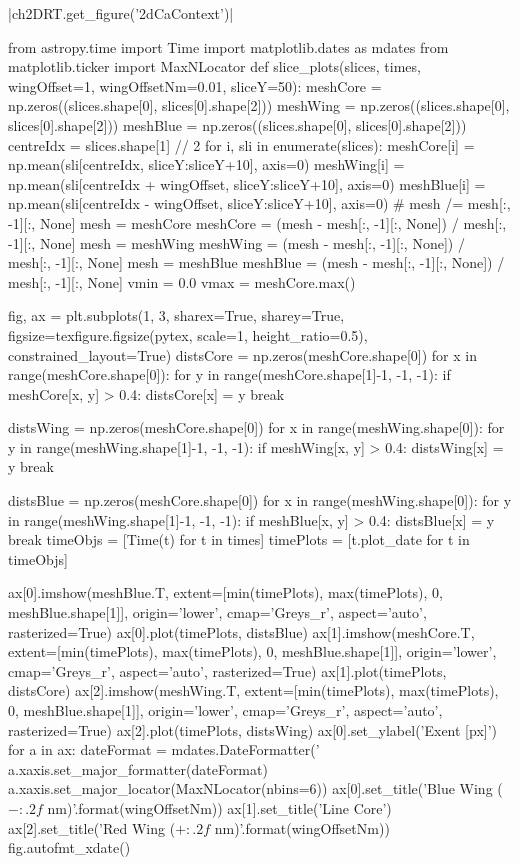 \py[2DRT]|ch2DRT.get_figure('2dCaContext')|

\begin{pycode}[2DRT]
from astropy.time import Time
import matplotlib.dates as mdates
from matplotlib.ticker import MaxNLocator
def slice_plots(slices, times, wingOffset=1, wingOffsetNm=0.01, sliceY=50):
    meshCore = np.zeros((slices.shape[0], slices[0].shape[2]))
    meshWing = np.zeros((slices.shape[0], slices[0].shape[2]))
    meshBlue = np.zeros((slices.shape[0], slices[0].shape[2]))
    centreIdx = slices.shape[1] // 2
    for i, sli in enumerate(slices):
        meshCore[i] = np.mean(sli[centreIdx, sliceY:sliceY+10], axis=0)
        meshWing[i] = np.mean(sli[centreIdx + wingOffset, sliceY:sliceY+10], axis=0)
        meshBlue[i] = np.mean(sli[centreIdx - wingOffset, sliceY:sliceY+10], axis=0)
    # mesh /= mesh[:, -1][:, None]
    mesh = meshCore
    meshCore = (mesh - mesh[:, -1][:, None]) / mesh[:, -1][:, None]
    mesh = meshWing
    meshWing = (mesh - mesh[:, -1][:, None]) / mesh[:, -1][:, None]
    mesh = meshBlue
    meshBlue = (mesh - mesh[:, -1][:, None]) / mesh[:, -1][:, None]
    vmin = 0.0
    vmax = meshCore.max()

    fig, ax = plt.subplots(1, 3, sharex=True, sharey=True, figsize=texfigure.figsize(pytex, scale=1, height_ratio=0.5), constrained_layout=True)
    distsCore = np.zeros(meshCore.shape[0])
    for x in range(meshCore.shape[0]):
        for y in range(meshCore.shape[1]-1, -1, -1):
            if meshCore[x, y] > 0.4:
                distsCore[x] = y
                break

    distsWing = np.zeros(meshCore.shape[0])
    for x in range(meshWing.shape[0]):
        for y in range(meshWing.shape[1]-1, -1, -1):
            if meshWing[x, y] > 0.4:
                distsWing[x] = y
                break

    distsBlue = np.zeros(meshCore.shape[0])
    for x in range(meshWing.shape[0]):
        for y in range(meshWing.shape[1]-1, -1, -1):
            if meshBlue[x, y] > 0.4:
                distsBlue[x] = y
                break
    timeObjs = [Time(t) for t in times]
    timePlots = [t.plot_date for t in timeObjs]

    ax[0].imshow(meshBlue.T,
                 extent=[min(timePlots), max(timePlots), 0, meshBlue.shape[1]],
                 origin='lower', cmap='Greys_r', aspect='auto', rasterized=True)
    ax[0].plot(timePlots, distsBlue)
    ax[1].imshow(meshCore.T,
                 extent=[min(timePlots), max(timePlots), 0, meshBlue.shape[1]],
                 origin='lower', cmap='Greys_r', aspect='auto', rasterized=True)
    ax[1].plot(timePlots, distsCore)
    ax[2].imshow(meshWing.T,
                 extent=[min(timePlots), max(timePlots), 0, meshBlue.shape[1]],
                 origin='lower', cmap='Greys_r', aspect='auto', rasterized=True)
    ax[2].plot(timePlots, distsWing)
    ax[0].set_ylabel('Exent [px]')
    for a in ax:
        dateFormat = mdates.DateFormatter('%
        a.xaxis.set_major_formatter(dateFormat)
        a.xaxis.set_major_locator(MaxNLocator(nbins=6))
    ax[0].set_title('Blue Wing ($-{:.2f}$ nm)'.format(wingOffsetNm))
    ax[1].set_title('Line Core')
    ax[2].set_title('Red Wing ($+{:.2f}$ nm)'.format(wingOffsetNm))
    fig.autofmt_xdate()


\end{pycode}
